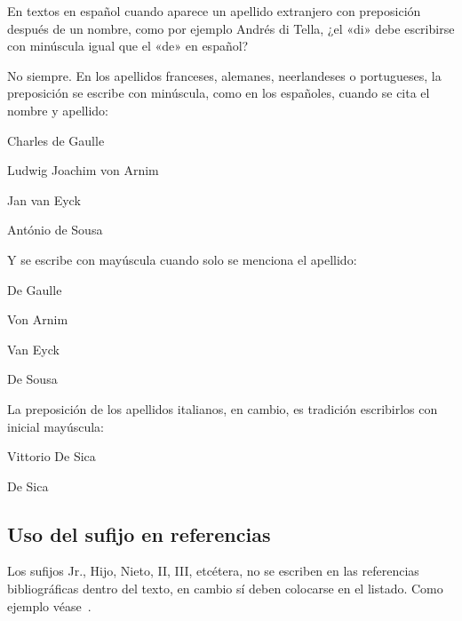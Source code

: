 \documentclass{book}
\begin{document}
{{{{{{{{En textos en español cuando aparece un apellido extranjero con preposición después de un nombre, como por ejemplo Andrés di Tella, ¿el «di» debe escribirse con minúscula igual que el «de» en español?

No siempre. En los apellidos franceses, alemanes, neerlandeses o portugueses, la preposición se escribe con minúscula, como en los españoles, cuando se cita el nombre y apellido:

\begin{mdframed}[linewidth=.5pt,linecolor=black!30,roundcorner=3pt,backgroundcolor=yellow!15]
\begin{compactitem}
\item Charles de Gaulle
\item Ludwig Joachim von Arnim
\item Jan van Eyck
\item António de Sousa
\end{compactitem}
\end{mdframed}

Y se escribe con mayúscula cuando solo se menciona el apellido:

\begin{mdframed}[linewidth=.5pt,linecolor=black!30,roundcorner=3pt,backgroundcolor=yellow!15]
\begin{compactitem}
\item De Gaulle
\item Von Arnim
\item Van Eyck
\item De Sousa
\end{compactitem}
\end{mdframed}

La preposición de los apellidos italianos, en cambio, es tradición escribirlos con inicial mayúscula:

\begin{mdframed}[linewidth=.5pt,linecolor=black!30,roundcorner=3pt,backgroundcolor=yellow!15]
\begin{compactitem}
\item Vittorio De Sica
\item De Sica
\end{compactitem}
\end{mdframed}

\subsection{Uso del sufijo en referencias}

Los sufijos Jr., Hijo, Nieto, II, III, etcétera, no se escriben en las referencias bibliográficas dentro del texto, en cambio sí deben colocarse en el listado. Como ejemplo véase~\textcite{III1989}.

}}}}}}}}
\end{document}
